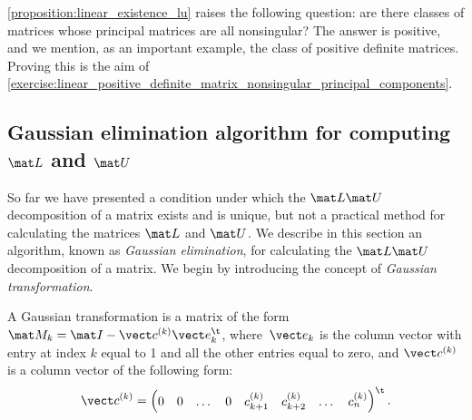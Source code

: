 
\cref{proposition:linear_existence_lu} raises the following question:
are there classes of matrices whose principal matrices are all nonsingular?
The answer is positive, and we mention,
as an important example, the class of positive definite matrices.
Proving this is the aim of \cref{exercise:linear_positive_definite_matrix_nonsingular_principal_components}.

\subsection*{Gaussian elimination algorithm for computing $\mat L$ and $\mat U$}%
\label{sub:gaussian_elimination_algorithm_for_computing_mat_l_and_mat_u_}

So far we have presented a condition under which the $\mat L \mat U$ decomposition of a matrix exists and is unique,
but not a practical method for calculating the matrices $\mat L$ and $\mat U$.
We describe in this section an algorithm,
known as \emph{Gaussian elimination},
for calculating the $\mat L \mat U$ decomposition of a matrix.
We begin by introducing the concept of \emph{Gaussian transformation}.
\begin{definition}
    A Gaussian transformation is a matrix of the form $\mat M_k = \mat I - \vect c^{(k)} \vect e_k^\t$,
    where~$\vect e_k$ is the column vector with entry at index $k$ equal to 1 and all the other entries equal to zero,
    and $\vect c^{(k)}$ is a column vector of the following form:
    \[
        \vect c^{(k)} =
        \begin{pmatrix}
            0 & 0 & \dots & 0 & c^{(k)}_{k+1} & c^{(k)}_{k+2} & \dots & c^{(k)}_n
        \end{pmatrix}^\t.
    \]
\end{definition}

